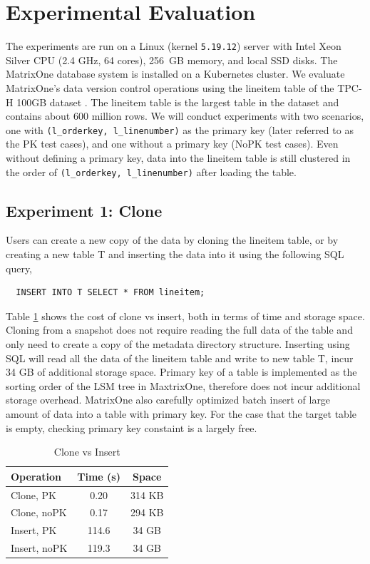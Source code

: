 \documentclass[sigconf,nonacm]{acmart} %
\begin{document}
\section{Experimental Evaluation}\label{sec:eval}
The experiments are run on a Linux (kernel \texttt{5.19.12}) server
with Intel Xeon Silver CPU (2.4 GHz, 64 cores), 256~GB memory, 
and local SSD disks.  The MatrixOne database system is installed 
on a Kubernetes cluster.  We evaluate MatrixOne's data version 
control operations using the lineitem table of the TPC-H 
100GB dataset \cite{TPCH}.  
The lineitem table is the largest table in the dataset and contains 
about 600 million rows.  We will conduct experiments with 
two scenarios, one with \texttt{(l\_orderkey, l\_linenumber)} as 
the primary key (later referred to as the PK test cases), and one without 
a primary key (NoPK test cases).  Even without defining a primary key,
data into the lineitem table is still clustered in the order of
\texttt{(l\_orderkey, l\_linenumber)} after loading the table.

\subsection{Experiment 1: Clone}\label{sec:expClone}
Users can create a new copy of the data by cloning the lineitem table,
or by creating a new table T and inserting the data into it
using the following SQL query,
\begin{verbatim}
  INSERT INTO T SELECT * FROM lineitem;
\end{verbatim}
Table \ref{tab:clone} shows the cost of clone vs insert, both in terms of time 
and storage space.  Cloning from a snapshot does not require 
reading the full data of the table and only need 
to create a copy of the metadata directory structure.  
Inserting using SQL will read all the data of the lineitem table and write 
to new table T, incur 34 GB of additional storage space.  
Primary key of a table is implemented as the sorting order 
of the LSM tree in MaxtrixOne, therefore does not incur additional 
storage overhead.  MatrixOne also carefully optimized batch insert of 
large amount of data into a table with primary key.  For the case that
the target table is empty, checking primary key constaint is a largely free.

\begin{table}[h]
  \centering
  \caption{Clone vs Insert}
  \label{tab:clone}
  \begin{tabular}{lcc}
    \toprule
    \textbf{Operation} & \textbf{Time (s)} & \textbf{Space} \\
    \midrule
    Clone, PK  & 0.20 & 314 KB \\
    Clone, noPK & 0.17 & 294 KB \\
    Insert, PK  & 114.6 & 34 GB \\
    Insert, noPK & 119.3 & 34 GB \\
    \bottomrule
  \end{tabular}
\end{table}
\end{document}
